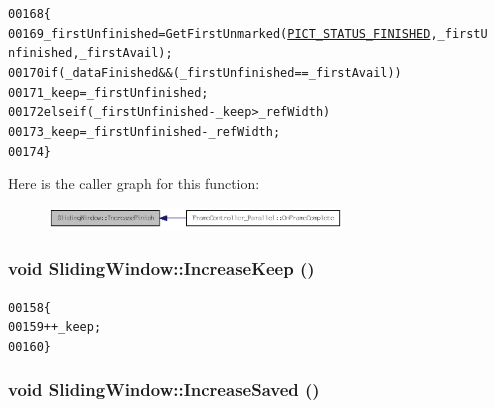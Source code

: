 \begin{footnotesize}\begin{alltt}
00168         \{
00169                 \_firstUnfinished = GetFirstUnmarked(\hyperlink{_picture_info_8h_a170d5962358e97425e08d5646653494b}{PICT_STATUS_FINISHED}, \_firstU
      nfinished, \_firstAvail);
00170                 \textcolor{keywordflow}{if} (\_dataFinished && (\_firstUnfinished == \_firstAvail))
00171                         \_keep = \_firstUnfinished;
00172                 \textcolor{keywordflow}{else} \textcolor{keywordflow}{if} (\_firstUnfinished - \_keep > \_refWidth)
00173                         \_keep = \_firstUnfinished - \_refWidth;
00174         \}
\end{alltt}\end{footnotesize}




Here is the caller graph for this function:\nopagebreak
\begin{figure}[H]
\begin{center}
\leavevmode
\includegraphics[width=221pt]{class_sliding_window_a8f303bc211297021f20e09dced119207_icgraph}
\end{center}
\end{figure}


\hypertarget{class_sliding_window_a9b7a7426f6a495da2770e0743d4c97d7}{
\subsubsection[{IncreaseKeep}]{\setlength{\rightskip}{0pt plus 5cm}void SlidingWindow::IncreaseKeep ()}}
\label{class_sliding_window_a9b7a7426f6a495da2770e0743d4c97d7}




\begin{footnotesize}\begin{alltt}
00158         \{
00159                 ++\_keep;
00160         \}
\end{alltt}\end{footnotesize}


\hypertarget{class_sliding_window_aea027ce6f77dcee09d1aafb31d5732c5}{
\subsubsection[{IncreaseSaved}]{\setlength{\rightskip}{0pt plus 5cm}void SlidingWindow::IncreaseSaved ()}}
\label{class_sliding_window_aea027ce6f77dcee09d1aafb31d5732c5}




